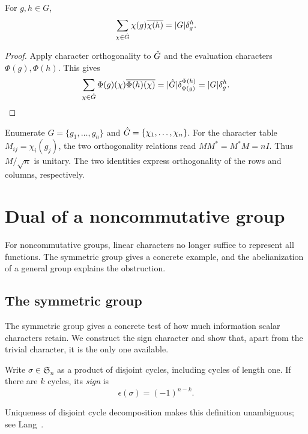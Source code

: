 
\begin{prop}
\label{prop-relations-orthogonalite-duale-grpe-abelien}
For $g,h\in G$,
\[
 \sum_{\chi\in\hat{G}}\chi(g)\overline{\chi(h)}=|G|\delta_g^h.
\]
\end{prop}
\begin{proof}
Apply character orthogonality to $\hat{G}$ and the evaluation characters
$\Phi(g),\Phi(h)$. This gives
\begin{equation}
\label{eq-rel-orth-col-temp}
 \sum_{\chi\in\hat{G}}\Phi(g)(\chi)\overline{\Phi(h)(\chi)}
 =|\hat{G}|\delta_{\Phi(g)}^{\Phi(h)}=|G|\delta_g^h.
\end{equation}
\end{proof}


\begin{rem}
Enumerate $G=\{g_1,\ldots,g_n\}$ and
$\hat{G}=\{\chi_1,\ldots,\chi_n\}$. For the character table
$M_{ij}=\chi_i(g_j)$, the two orthogonality relations read
$MM^*=M^*M=nI$. Thus $M/\sqrt n$ is unitary. The two identities express
orthogonality of the rows and columns, respectively.
\end{rem}

\section{Dual of a noncommutative group}
\label{sect1-dual-non-commutative-group}
For noncommutative groups, linear characters no longer suffice to represent
all functions. The symmetric group gives a concrete example, and
the abelianization of a general group explains the obstruction.

\subsection{The symmetric group}
\label{sect2-exmp-dual-sn}\label{notation-17}

The symmetric group gives a concrete test of how much information scalar
characters retain. We construct the sign character and show that, apart from
the trivial character, it is the only one available.

\begin{defn}
Write $\sigma\in\mathfrak S_n$ as a product of disjoint cycles, including
cycles of length one. If there are $k$ cycles, its \emph{sign} is
\[
 \epsilon(\sigma)=(-1)^{n-k}.
\]
\end{defn}
Uniqueness of disjoint cycle decomposition makes this definition unambiguous;
see Lang~\cite{lang}.

